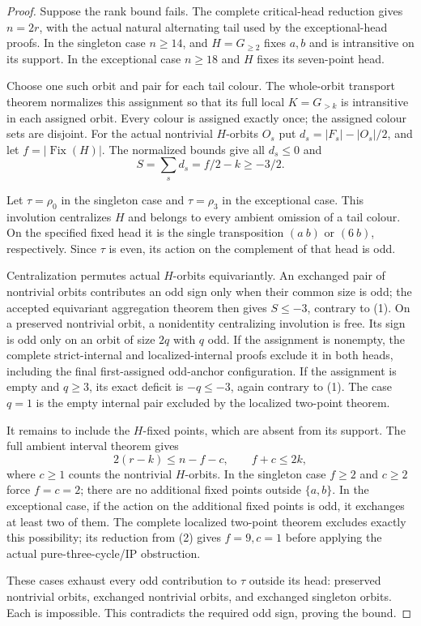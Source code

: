 \documentclass[11pt,a4paper]{article}
\begin{document}
\begin{proof}
Suppose the rank bound fails. The complete critical-head reduction
gives $n=2r$, with the actual natural alternating tail used by the
exceptional-head proofs. In the singleton case $n\ge14$, and
$H=G_{\ge2}$ fixes $a,b$ and is intransitive on its support.
In the exceptional case $n\ge18$ and $H$ fixes its seven-point head.

Choose one such orbit and pair for each tail colour. The whole-orbit
transport theorem normalizes this assignment so that its full local
$K=G_{>k}$ is intransitive in each assigned orbit. Every colour is
assigned exactly once; the assigned colour sets are disjoint.
For the actual nontrivial $H$-orbits $O_s$ put
$d_s=|F_s|-|O_s|/2$, and let $f=|\operatorname{Fix}(H)|$.
The normalized bounds give all $d_s\le0$ and
\[
                    S=\sum_s d_s=f/2-k\ge-3/2.       \tag{1}
\]

Let $\tau=\rho_0$ in the singleton case and $\tau=\rho_3$
in the exceptional case. This involution centralizes $H$ and
belongs to every ambient omission of a tail colour.
On the specified fixed head it is the single transposition
$(a\ b)$ or $(6\ b)$, respectively. Since $\tau$ is even,
its action on the complement of that head is odd.

Centralization permutes actual $H$-orbits equivariantly.
An exchanged pair of nontrivial orbits contributes an odd sign
only when their common size is odd; the accepted equivariant
aggregation theorem then gives $S\le-3$, contrary to (1).
On a preserved nontrivial orbit, a nonidentity centralizing
involution is free. Its sign is odd only on an orbit of size
$2q$ with $q$ odd. If the assignment is nonempty, the complete
strict-internal and localized-internal proofs exclude it in both
heads, including the final first-assigned odd-anchor configuration.
If the assignment is empty and $q\ge3$, its exact deficit
is $-q\le-3$, again contrary to (1). The case $q=1$ is the
empty internal pair excluded by the localized two-point theorem.

It remains to include the $H$-fixed points, which are absent
from its support. The full ambient interval theorem gives
\[
            2(r-k)\le n-f-c,\qquad f+c\le2k,          \tag{2}
\]
where $c\ge1$ counts the nontrivial $H$-orbits.
In the singleton case $f\ge2$ and $c\ge2$ force $f=c=2$;
there are no additional fixed points outside $\{a,b\}$.
In the exceptional case, if the action on the additional fixed
points is odd, it exchanges at least two of them. The complete
localized two-point theorem excludes exactly this possibility;
its reduction from (2) gives $f=9,c=1$ before applying the actual
pure-three-cycle/IP obstruction.

These cases exhaust every odd contribution to $\tau$ outside
its head: preserved nontrivial orbits, exchanged nontrivial orbits,
and exchanged singleton orbits. Each is impossible. This contradicts
the required odd sign, proving the bound.
\end{proof}
\end{document}
